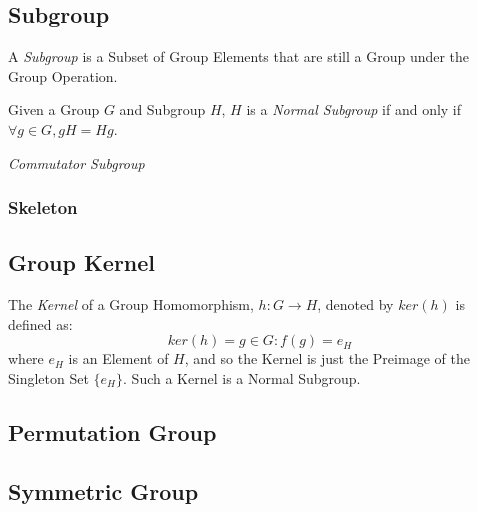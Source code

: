 \subsection{Subgroup}\label{subsec:subgroup}

A \emph{Subgroup} is a Subset of Group Elements that are still a Group
under the Group Operation.

Given a Group $G$ and Subgroup $H$, $H$ is a \emph{Normal Subgroup} if
and only if $\forall g \in G, gH = Hg$.

\emph{Commutator Subgroup}



\subsubsection{Skeleton}



\subsection{Group Kernel}\label{subsec:group_kernel}

The \emph{Kernel} of a Group Homomorphism, $h : G \rightarrow H$,
denoted by $ker(h)$ is defined as:
\[
    ker(h) = {g \in G : f(g) = e_H}
\]
where $e_H$ is an Element of $H$, and so the Kernel is just the
Preimage of the Singleton Set $\{e_H\}$. Such a Kernel is a Normal
Subgroup.



\subsection{Permutation Group}\label{subsec:permutation_group}



\subsection{Symmetric Group}\label{subsec:symmetric_group}

